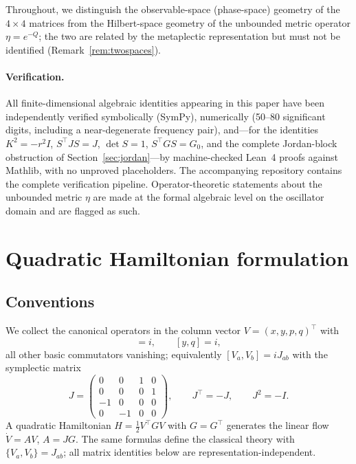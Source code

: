 \documentclass[11pt]{article}
\theoremstyle{definition}
\theoremstyle{remark}
\begin{document}
Throughout, we distinguish the observable-space (phase-space) geometry of the
$4\times4$ matrices from the Hilbert-space geometry of the unbounded metric
operator $\eta=e^{-Q}$; the two are related by the metaplectic representation
but must not be identified (Remark~\ref{rem:twospaces}).

\paragraph{Verification.}
All finite-dimensional algebraic identities appearing in this paper have been
independently verified symbolically (SymPy), numerically (50--80 significant
digits, including a near-degenerate frequency pair), and---for the identities
$K^2=-r^2I$, $S^{\top}JS=J$, $\det S=1$, $S^{\top}GS=G_0$, and the complete
Jordan-block obstruction of Section~\ref{sec:jordan}---by machine-checked
Lean~4 proofs against Mathlib, with no unproved placeholders.  The
accompanying repository contains the complete verification pipeline.
Operator-theoretic statements about the unbounded metric $\eta$ are made at
the formal algebraic level on the oscillator domain and are flagged as such.

\section{Quadratic Hamiltonian formulation}\label{sec:setup}

\subsection{Conventions}

We collect the canonical operators in the column vector $V=(x,y,p,q)^{\top}$
with
\begin{equation}
[x,p]=i,\qquad [y,q]=i,
\end{equation}
all other basic commutators vanishing; equivalently $[V_a,V_b]=iJ_{ab}$ with
the symplectic matrix
\begin{equation}
J=\begin{pmatrix}0&0&1&0\\0&0&0&1\\-1&0&0&0\\0&-1&0&0\end{pmatrix},
\qquad J^{\top}=-J,\qquad J^2=-I .
\end{equation}
A quadratic Hamiltonian $H=\tfrac12V^{\top}GV$ with $G=G^{\top}$ generates the
linear flow $\dot V=AV$, $A=JG$.  The same formulas define the classical
theory with $\{V_a,V_b\}=J_{ab}$; all matrix identities below are
representation-independent.
\end{document}
